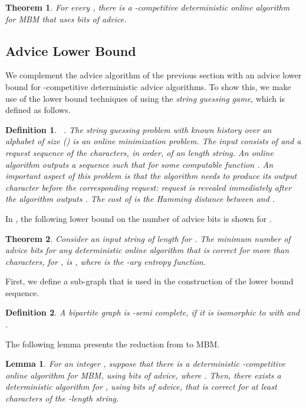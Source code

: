 \documentclass[a4paper]{article}
\newtheorem{theorem}{Theorem}
\newtheorem{lemma}{Lemma}
\newtheorem{definition}{Definition}
\begin{document}
\begin{theorem} \label{thm:ub-advice}
 For every , there is a -competitive deterministic online algorithm for \textsc{MBM}
 that uses  bits of advice.
\end{theorem}



\subsection{ Advice Lower Bound}
We complement the advice algorithm of the previous section with an 
advice lower bound for -competitive deterministic advice algorithms.
To show this, we make use of the lower bound techniques
of \cite{bhkkss14} using the {\em string guessing game}, which is defined as follows.

\begin{definition}{~\textup{\cite{bhkkss14}}.} The {\em string guessing problem with known history}
over an alphabet  of size  () is an online minimization problem. The input consists
of  and a request sequence  of the characters, in order, of an  length string.
An online algorithm  outputs a sequence  such that 
for some computable function .  An important aspect of this problem is that the algorithm needs to produce its output character \emph{before} the corresponding request: request  is revealed immediately after the algorithm outputs . The cost of  is the Hamming distance between  and .
\end{definition}

In \cite{bhkkss14}, the following lower bound on the number of advice bits is shown for .

\begin{theorem}{\textup{\cite{bhkkss14}}}\label{thm:BockThm}
  Consider an input string of length  for . The minimum number of advice bits for any
  deterministic online algorithm that is correct for more than  characters,
  for , is
  , where  is the
  -ary entropy function.
\end{theorem}

First, we define a sub-graph that is used in the construction of the lower bound sequence.

\begin{definition}
 A bipartite graph is {\em -semi complete}, if it is isomorphic to
  with  and
 .
\end{definition}

The following lemma presents the reduction from  to \textsc{MBM}.

\begin{lemma}\label{lem:reduceMat}
  For an integer , suppose that there is a deterministic -competitive online algorithm for
  \textsc{MBM}, using  bits of advice, where .
  Then, there exists a deterministic algorithm for , using  bits of advice, that is correct
  for at least  characters of the -length string.
\end{lemma}
\end{document}
